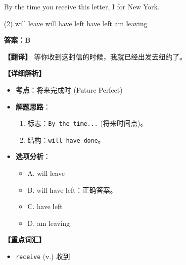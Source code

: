 \documentclass[11pt, a4paper]{article}
\newcommand{\analysis}[4]{
    \begin{solutionbox}
        \textbf{答案：#1}
        
        \textbf{【翻译】} #2
        
        \textbf{【详细解析】}
        #3
        
        \textbf{【重点词汇】}
        #4
    \end{solutionbox}
}
\newcommand{\blank}{\underline{\hspace{1.5cm}}}
\begin{document}
\begin{questions}
    \item By the time you receive this letter, I \blank for New York.
    \begin{tasks}(2)
        \task will leave \task will have left
        \task have left \task am leaving
    \end{tasks}
    \analysis{B}{等你收到这封信的时候，我就已经出发去纽约了。}{
        \begin{itemize}
            \item \textbf{考点}：将来完成时 (Future Perfect)
            \item \textbf{解题思路}：
                \begin{enumerate}
                    \item 标志：\texttt{By the time...} (将来时间点)。
                    \item 结构：\texttt{will have done}。
                \end{enumerate}
            \item \textbf{选项分析}：
                \begin{itemize}
                    \item A. will leave
                    \item B. will have left：正确答案。
                    \item C. have left
                    \item D. am leaving
                \end{itemize}
        \end{itemize}
    }{
        \begin{itemize}
            \item \texttt{receive} (v.) 收到
        \end{itemize}
    }


\end{questions}
\end{document}
